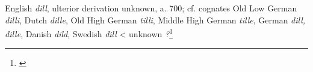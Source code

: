 \begin{etymology}\label{ety:dill}
English \textit{dill}, ulterior derivation unknown, a. 700; cf. cognates  Old Low German \textit{dilli}, Dutch \textit{dille}, Old High German \textit{tilli}, Middle High German \textit{tille}, German \textit{dill, dille}, Danish \textit{dild}, Swedish \textit{dill} 
< unknown \textit{?}\footnote{\textcite[s.v. dill]{oed}}
\end{etymology}